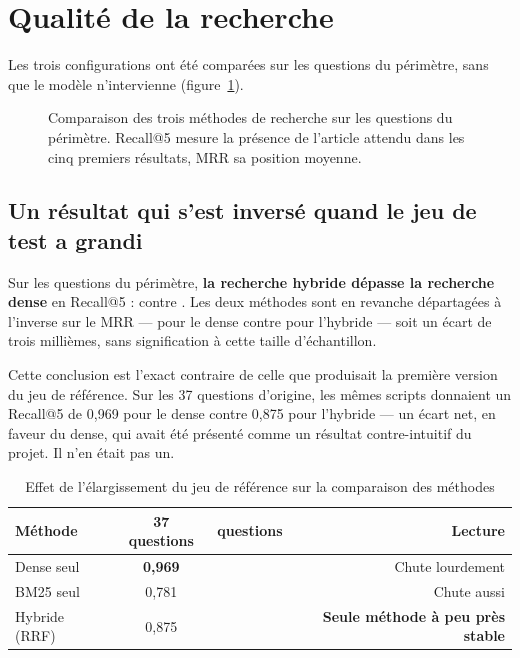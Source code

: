 \section{Qualité de la recherche}

Les trois configurations ont été comparées sur les \NbInScope{} questions du périmètre, sans que
le modèle n'intervienne (figure~\ref{fig:recherche}).

\begin{figure}[htbp]
  \centering
  
  \caption[Comparaison des méthodes de recherche]{Comparaison des trois méthodes de recherche sur
  les \NbInScope{} questions du périmètre. Recall@5 mesure la présence de l'article attendu dans
  les cinq premiers résultats, MRR sa position moyenne.}
  \label{fig:recherche}
\end{figure}

\subsection{Un résultat qui s'est inversé quand le jeu de test a grandi}
\label{sec:inversion}

Sur les \NbInScope{} questions du périmètre, \textbf{la recherche hybride dépasse la recherche
dense} en Recall@5 : \RecallHybride{} contre \RecallDense{}. Les deux méthodes sont en revanche
départagées à l'inverse sur le MRR --- \MrrDense{} pour le dense contre \MrrHybride{} pour
l'hybride --- soit un écart de trois millièmes, sans signification à cette taille d'échantillon.

Cette conclusion est l'exact contraire de celle que produisait la première version du jeu de
référence. Sur les 37 questions d'origine, les mêmes scripts donnaient un Recall@5 de 0,969 pour le
dense contre 0,875 pour l'hybride --- un écart net, en faveur du dense, qui avait été présenté
comme un résultat contre-intuitif du projet. Il n'en était pas un.

\begin{table}[htbp]
  \centering
  \caption{Effet de l'élargissement du jeu de référence sur la comparaison des méthodes}
  \label{tab:inversion}
  \small
  \begin{tabularx}{\textwidth}{@{}>{\raggedright\arraybackslash}p{3.4cm} c c R@{}}
    \toprule
    \sffamily\bfseries\color{navy}Méthode &
    \sffamily\bfseries\color{navy}37 questions &
    \sffamily\bfseries\color{navy}\NbQuestions{} questions &
    \sffamily\bfseries\color{navy}Lecture \\
    \midrule
    Dense seul     & \textbf{0,969} & \RecallDense{} & Chute lourdement \\
    BM25 seul      & 0,781 & \RecallBmXXV{} & Chute aussi \\
    Hybride (RRF)  & 0,875 & \textbf{\RecallHybride{}} & \textbf{Seule méthode à peu près stable} \\
    \bottomrule
  \end{tabularx}
\end{table}

